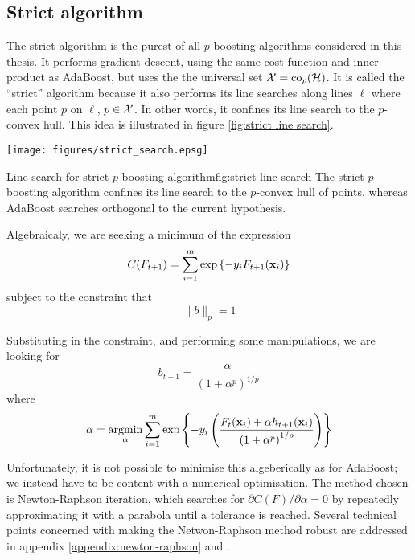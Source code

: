 \subsection{Strict algorithm}

The strict algorithm is the purest of all $p$-boosting algorithms
considered in this thesis.  It performs gradient descent, using the
same cost function and inner product as AdaBoost, but uses the the
universal set $\mathcal{X} = \mathrm{co}_p(\mathcal{H})$.  It is called the ``strict''
algorithm because it also performs its line searches along lines
$\ell$ where each point $p$ on $\ell$, $p \in \mathcal{X}$.  In other words,
it confines its line search to the $p$-convex hull.  This idea is
illustrated in figure \ref{fig:strict line search}.

\begin{linefigure}
\begin{center}
\texttt{[image: figures/strict\_search.epsg]}
\end{center}
\begin{capt}{Line search for strict $p$-boosting algorithm}{fig:strict line search}
The strict $p$-boosting algorithm confines its line search to the
$p$-convex hull of points, whereas AdaBoost searches orthogonal to the
current hypothesis.
\end{capt}
\end{linefigure}

Algebraicaly, we are seeking a minimum of the expression
%
\begin{equation}
C(F_{t+1}) = \sum_{i=1}^{m} \exp \left\{ -y_i F_{t+1}(\mathbf{x}_i) \right\}
\end{equation}
%
subject to the constraint that
%
\begin{equation}
\| b \|_{p} = 1
\end{equation}

Substituting in the constraint, and performing some manipulations, we
are looking for
%
\begin{equation}
b_{t+1} = \frac{\alpha}{\left( 1 + \alpha^p \right) ^ {1/p}}
\end{equation}
%
where
%
\begin{equation}
\alpha = \argmin_{\alpha} \sum_{i=1}^{m} \exp \left\{ -y_i \left(
\frac{F_{t}(\bfx_i) + \alpha h_{t+1}(\bfx_i)}{\left( 1 + \alpha ^p
\right) ^{1/p}} \right) \right\}
\label{eqn:strict minimise function}
\end{equation}

Unfortunately, it is not possible to minimise this algeberically as
for AdaBoost; we instead have to be content with a numerical
optimisation.  The method chosen is Newton-Raphson iteration, which
searches for $\partial C(F) / \partial \alpha = 0$ by repeatedly
approximating it with a parabola until a tolerance is reached.
Several technical points concerned with making the Netwon-Raphson
method robust are addressed in appendix \ref{appendix:newton-raphson}
and \cite{Heath97}.

